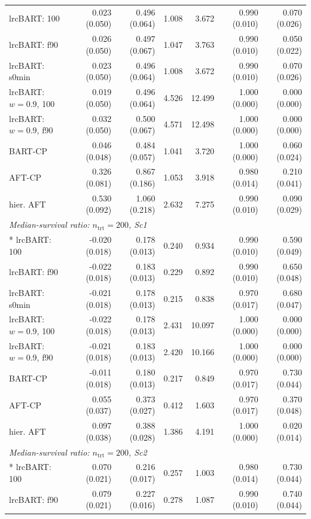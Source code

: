 \begin{landscape}
\begin{longtable}{lrrrrrr}
lrcBART: 100 & 0.023 (0.050) & 0.496 (0.064) & 1.008 & 3.672 & 0.990 (0.010) & 0.070 (0.026) \\
lrcBART: f90 & 0.026 (0.050) & 0.497 (0.067) & 1.047 & 3.763 & 0.990 (0.010) & 0.050 (0.022) \\
lrcBART: s0min & 0.023 (0.050) & 0.496 (0.064) & 1.008 & 3.672 & 0.990 (0.010) & 0.070 (0.026) \\
lrcBART: $w=0.9$, 100 & 0.019 (0.050) & 0.496 (0.064) & 4.526 & 12.499 & 1.000 (0.000) & 0.000 (0.000) \\
lrcBART: $w=0.9$, f90 & 0.032 (0.050) & 0.500 (0.067) & 4.571 & 12.498 & 1.000 (0.000) & 0.000 (0.000) \\
BART-CP & 0.046 (0.048) & 0.484 (0.057) & 1.041 & 3.720 & 1.000 (0.000) & 0.060 (0.024) \\
AFT-CP & 0.326 (0.081) & 0.867 (0.186) & 1.053 & 3.918 & 0.980 (0.014) & 0.210 (0.041) \\
hier. AFT & 0.530 (0.092) & 1.060 (0.218) & 2.632 & 7.275 & 0.990 (0.010) & 0.090 (0.029) \\
\multicolumn{7}{l}{\strut\textit{Median-survival ratio: $n_{\mathrm{trt}}=200$, Sc1}}\\*
lrcBART: 100 & -0.020 (0.018) & 0.178 (0.013) & 0.240 & 0.934 & 0.990 (0.010) & 0.590 (0.049) \\
lrcBART: f90 & -0.022 (0.018) & 0.183 (0.013) & 0.229 & 0.892 & 0.990 (0.010) & 0.650 (0.048) \\
lrcBART: s0min & -0.021 (0.018) & 0.178 (0.013) & 0.215 & 0.838 & 0.970 (0.017) & 0.680 (0.047) \\
lrcBART: $w=0.9$, 100 & -0.022 (0.018) & 0.178 (0.013) & 2.431 & 10.097 & 1.000 (0.000) & 0.000 (0.000) \\
lrcBART: $w=0.9$, f90 & -0.021 (0.018) & 0.183 (0.013) & 2.420 & 10.166 & 1.000 (0.000) & 0.000 (0.000) \\
BART-CP & -0.011 (0.018) & 0.180 (0.013) & 0.217 & 0.849 & 0.970 (0.017) & 0.730 (0.044) \\
AFT-CP & 0.055 (0.037) & 0.373 (0.027) & 0.412 & 1.603 & 0.970 (0.017) & 0.370 (0.048) \\
hier. AFT & 0.097 (0.038) & 0.388 (0.028) & 1.386 & 4.191 & 1.000 (0.000) & 0.020 (0.014) \\
\multicolumn{7}{l}{\strut\textit{Median-survival ratio: $n_{\mathrm{trt}}=200$, Sc2}}\\*
lrcBART: 100 & 0.070 (0.021) & 0.216 (0.017) & 0.257 & 1.003 & 0.980 (0.014) & 0.730 (0.044) \\
lrcBART: f90 & 0.079 (0.021) & 0.227 (0.016) & 0.278 & 1.087 & 0.990 (0.010) & 0.740 (0.044) \\

\end{longtable}
\end{landscape}
